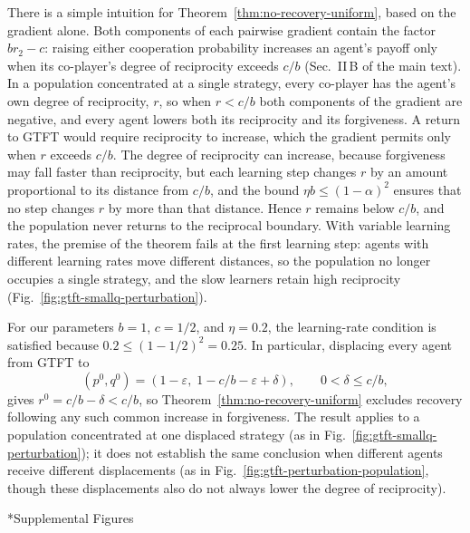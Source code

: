 \documentclass[10pt]{article}
\makeatletter
\newcommand{\eps}{\varepsilon}
\renewcommand\section{\@startsection{section}{1}{\z@}{-3ex \@plus -1ex \@minus -.2ex}{1.2ex \@plus .2ex}{\sffamily\bfseries\Large}}
\makeatother
\begin{document}
There is a simple intuition for Theorem~\ref{thm:no-recovery-uniform}, based on the gradient alone. Both components of each pairwise gradient contain the factor $b r_2 - c$: raising either cooperation probability increases an agent's payoff only when its co-player's degree of reciprocity exceeds $c/b$ (Sec.~II\,B of the main text). In a population concentrated at a single strategy, every co-player has the agent's own degree of reciprocity, $r$, so when $r < c/b$ both components of the gradient are negative, and every agent lowers both its reciprocity and its forgiveness. A return to GTFT would require reciprocity to increase, which the gradient permits only when $r$ exceeds $c/b$. The degree of reciprocity can increase, because forgiveness may fall faster than reciprocity, but each learning step changes $r$ by an amount proportional to its distance from $c/b$, and the bound $\eta b \le (1-\alpha)^2$ ensures that no step changes $r$ by more than that distance. Hence $r$ remains below $c/b$, and the population never returns to the reciprocal boundary. With variable learning rates, the premise of the theorem fails at the first learning step: agents with different learning rates move different distances, so the population no longer occupies a single strategy, and the slow learners retain high reciprocity (Fig.~\ref{fig:gtft-smallq-perturbation}).

For our parameters $b=1$, $c=1/2$, and $\eta=0.2$, the learning-rate condition is satisfied because $0.2\leq(1-1/2)^2=0.25$.
In particular, displacing every agent from GTFT to
\[
    (p^0,q^0)
    =
    \left(1-\eps,\;1-c/b-\eps+\delta\right),
    \qquad
    0<\delta\leq c/b,
\]
gives $r^0=c/b-\delta<c/b$, so Theorem~\ref{thm:no-recovery-uniform} excludes recovery following any such common increase in forgiveness.
The result applies to a population concentrated at one displaced strategy (as in Fig.~\ref{fig:gtft-smallq-perturbation}); it does not establish the same conclusion when different agents receive different displacements (as in Fig.~\ref{fig:gtft-perturbation-population}, though these displacements also do not always lower the degree of reciprocity).

\newpage

\section*{Supplemental Figures}

\setcounter{figure}{0}
\renewcommand{\thefigure}{S\arabic{figure}}
\renewcommand{\theHfigure}{S\arabic{figure}}
\end{document}
